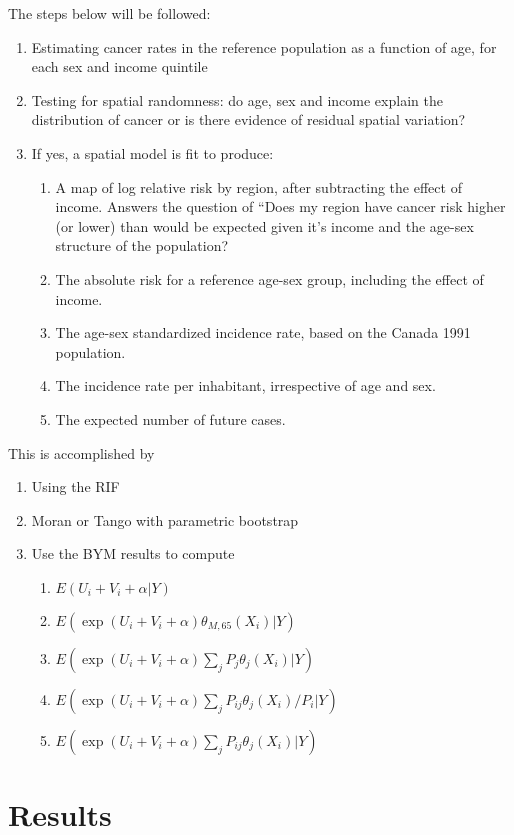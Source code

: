 \documentclass[12pt]{article}
\begin{document}
The steps below will be followed:
\begin{enumerate}
	\item Estimating cancer rates in the reference population as a function of age, for each sex and income quintile
	\item Testing for spatial randomness: do age, sex and income explain the distribution of cancer or is there evidence of residual spatial variation? 
	\item If yes, a spatial model is fit to produce:
\begin{enumerate}
	\item A map of log relative risk by region, after subtracting the effect of income.  Answers the question of ``Does my region have cancer risk higher (or lower) than would be expected given it's income and the age-sex structure of the population?
	\item The absolute risk for a reference age-sex group, including the effect of income.
	\item The age-sex standardized incidence rate, based on the Canada 1991  population.
	\item The incidence rate per inhabitant, irrespective of age and sex.
	\item The expected number of future cases.
	\end{enumerate}
\end{enumerate}

This is accomplished by 
\begin{enumerate}
	\item Using the RIF
	\item Moran or Tango with parametric bootstrap
	\item Use the BYM results to compute
\begin{enumerate}
	\item $E(U_i+V_i + \alpha | Y)$
	\item $E(\exp(U_i+V_i + \alpha) \theta_{M,65}(X_i) | Y)$
	\item $E(\exp(U_i+V_i + \alpha) \sum_j P_j \theta_j(X_i) | Y)$
	\item $E(\exp(U_i+V_i + \alpha) \sum_j P_{ij} \theta_j(X_i)/P_i | Y)$
	\item $E(\exp(U_i+V_i + \alpha) \sum_j P_{ij} \theta_j(X_i)| Y)$
\end{enumerate}
\end{enumerate}

\section{Results}
\end{document}
